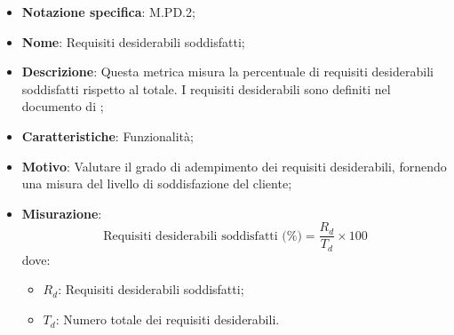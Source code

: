 \begin{itemize}
    \item \textbf{Notazione specifica}: M.PD.2;
    \item \textbf{Nome}: Requisiti desiderabili soddisfatti;
    \item \textbf{Descrizione}: Questa metrica misura la percentuale di requisiti desiderabili soddisfatti rispetto al totale. I requisiti desiderabili sono definiti nel documento di \AnalisiDeiRequisiti;
    \item \textbf{Caratteristiche}: Funzionalità;
    \item \textbf{Motivo}: Valutare il grado di adempimento dei requisiti desiderabili, fornendo una misura del livello di soddisfazione del cliente;
    \item \textbf{Misurazione}:
    \[
    \text{Requisiti desiderabili soddisfatti (\%)} = \frac{R_{d}}{T_{d}} \times 100
    \]
    dove:
    \begin{itemize}
        \item $R_{d}$: Requisiti desiderabili soddisfatti;
        \item $T_{d}$: Numero totale dei requisiti desiderabili.
    \end{itemize}
\end{itemize}